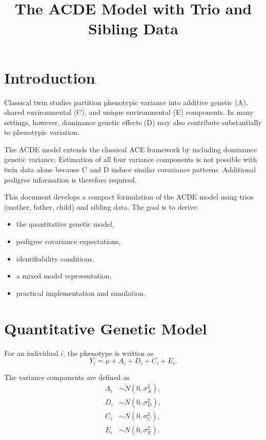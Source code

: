 \documentclass[11pt]{article}
\title{The ACDE Model with Trio and Sibling Data}
\date{}
\begin{document}
\maketitle
\vspace{-1em}
\tableofcontents
\vspace{1em}

\section{Introduction}

Classical twin studies partition phenotypic variance into additive genetic (A), 
shared environmental (C), and unique environmental (E) components. 
In many settings, however, dominance genetic effects (D) may also contribute 
substantially to phenotypic variation. 

The ACDE model extends the classical ACE framework by including dominance 
genetic variance. Estimation of all four variance components is not possible 
with twin data alone because C and D induce similar covariance patterns. 
Additional pedigree information is therefore required.

This document develops a compact formulation of the ACDE model using
trios (mother, father, child) and sibling data. The goal is to derive:

\begin{itemize}
\item the quantitative genetic model,
\item pedigree covariance expectations,
\item identifiability conditions,
\item a mixed model representation,
\item practical implementation and simulation.
\end{itemize}

\section{Quantitative Genetic Model}

For an individual $i$, the phenotype is written as
\begin{equation}
Y_i = \mu + A_i + D_i + C_i + E_i .
\end{equation}

The variance components are defined as
\begin{align}
A_i &\sim N(0,\sigma_A^2),\\
D_i &\sim N(0,\sigma_D^2),\\
C_i &\sim N(0,\sigma_C^2),\\
E_i &\sim N(0,\sigma_E^2).
\end{align}
\end{document}
